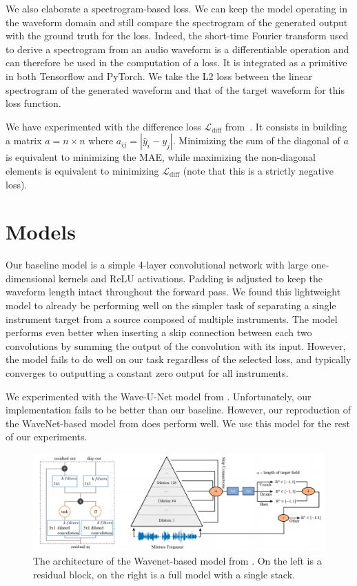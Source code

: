 \documentclass[twocolumn,superscriptaddress,aps]{revtex4-1}
\begin{document}
We also elaborate a spectrogram-based loss. We can keep the model operating in the waveform domain and still compare the spectrogram of the generated output with the ground truth for the loss. Indeed, the short-time Fourier transform used to derive a spectrogram from an audio waveform is a differentiable operation and can therefore be used in the computation of a loss. It is integrated as a primitive in both Tensorflow and PyTorch. We take the L2 loss between the linear spectrogram of the generated waveform and that of the target waveform for this loss function.

We have experimented with the difference loss $\mathcal{L}_{\text{diff}}$ from~\cite{SourceSeparationWaveformDomain}. It consists in building a matrix $a = n\times n$ where $a_{ij} = |\hat{y}_i - y_j|$. Minimizing the sum of the diagonal of $a$ is equivalent to minimizing the MAE, while maximizing the non-diagonal elements is equivalent to minimizing $\mathcal{L}_{\text{diff}}$ (note that this is a strictly negative loss).

\section{Models}
Our baseline model is a simple 4-layer convolutional network with large one-dimensional kernels and ReLU activations. Padding is adjusted to keep the waveform length intact throughout the forward pass. We found this lightweight model to already be performing well on the simpler task of separating a single instrument target from a source composed of multiple instruments. The model performs even better when inserting a skip connection between each two convolutions by summing the output of the convolution with its input. However, the model fails to do well on our task regardless of the selected loss, and typically converges to outputting a constant zero output for all instruments.

We experimented with the Wave-U-Net model from \cite{Wave-U-Net}. Unfortunately, our implementation fails to be better than our baseline. However, our reproduction of the WaveNet-based model from \cite{SourceSeparationWaveformDomain} does perform well. We use this model for the rest of our experiments.

\begin{figure}[t]
	\centering
	\includegraphics[width=.9\linewidth]{arch.png}
	\caption{The architecture of the Wavenet-based model from \cite{SourceSeparationWaveformDomain}. On the left is a residual block, on the right is a full model with a single stack.}
	\label{arch}
\end{figure}
\end{document}
